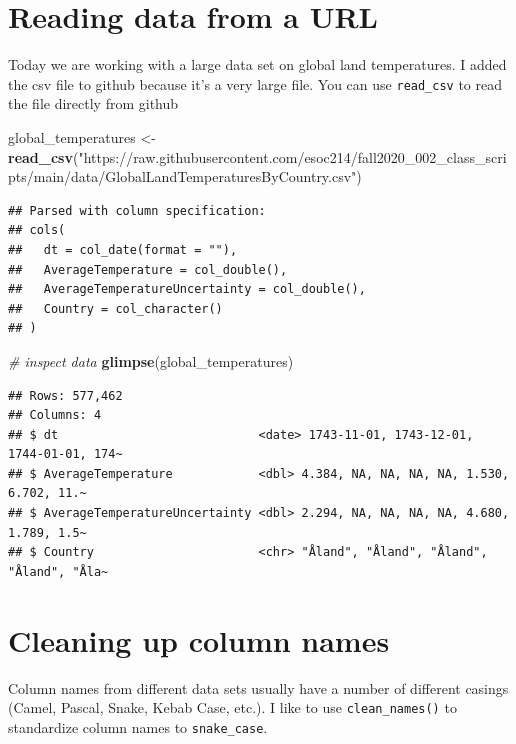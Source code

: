 \documentclass[
]{book}
\newenvironment{Shaded}{\begin{snugshade}}{\end{snugshade}}
\newcommand{\CommentTok}[1]{\textcolor[rgb]{0.56,0.35,0.01}{\textit{#1}}}
\newcommand{\KeywordTok}[1]{\textcolor[rgb]{0.13,0.29,0.53}{\textbf{#1}}}
\newcommand{\NormalTok}[1]{#1}
\newcommand{\StringTok}[1]{\textcolor[rgb]{0.31,0.60,0.02}{#1}}
\begin{document}
\hypertarget{reading-data-from-a-url}{%
\section{Reading data from a URL}\label{reading-data-from-a-url}}

Today we are working with a large data set on global land temperatures. I added the csv file to github because it's a very large file. You can use \texttt{read\_csv} to read the file directly from github

\begin{Shaded}
\begin{Highlighting}[]
\NormalTok{global_temperatures <-}\StringTok{ }\KeywordTok{read_csv}\NormalTok{(}\StringTok{"https://raw.githubusercontent.com/esoc214/fall2020_002_class_scripts/main/data/GlobalLandTemperaturesByCountry.csv"}\NormalTok{) }
\end{Highlighting}
\end{Shaded}

\begin{verbatim}
## Parsed with column specification:
## cols(
##   dt = col_date(format = ""),
##   AverageTemperature = col_double(),
##   AverageTemperatureUncertainty = col_double(),
##   Country = col_character()
## )
\end{verbatim}

\begin{Shaded}
\begin{Highlighting}[]
\CommentTok{# inspect data}
\KeywordTok{glimpse}\NormalTok{(global_temperatures)}
\end{Highlighting}
\end{Shaded}

\begin{verbatim}
## Rows: 577,462
## Columns: 4
## $ dt                            <date> 1743-11-01, 1743-12-01, 1744-01-01, 174~
## $ AverageTemperature            <dbl> 4.384, NA, NA, NA, NA, 1.530, 6.702, 11.~
## $ AverageTemperatureUncertainty <dbl> 2.294, NA, NA, NA, NA, 4.680, 1.789, 1.5~
## $ Country                       <chr> "Åland", "Åland", "Åland", "Åland", "Åla~
\end{verbatim}

\hypertarget{cleaning-up-column-names}{%
\section{Cleaning up column names}\label{cleaning-up-column-names}}

Column names from different data sets usually have a number of different casings (Camel, Pascal, Snake, Kebab Case, etc.). I like to use \texttt{clean\_names()} to standardize column names to \texttt{snake\_case}.
\end{document}
